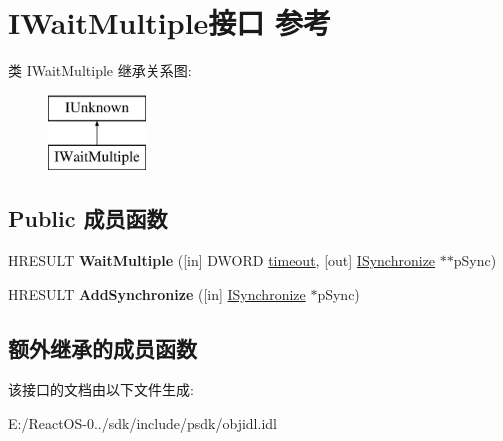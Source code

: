 \hypertarget{interface_i_wait_multiple}{}\section{I\+Wait\+Multiple接口 参考}
\label{interface_i_wait_multiple}
类 I\+Wait\+Multiple 继承关系图\+:\begin{figure}[H]
\begin{center}
\leavevmode
\includegraphics[height=2.000000cm]{interface_i_wait_multiple}
\end{center}
\end{figure}
\subsection*{Public 成员函数}
\begin{DoxyCompactItemize}
\item 
\mbox{\label{interface_i_wait_multiple_a8045e28628891ec72b5b2523a5f3c2fd}} 
H\+R\+E\+S\+U\+LT {\bfseries Wait\+Multiple} (\mbox{[}in\mbox{]} D\+W\+O\+RD \hyperlink{structtimeout}{timeout}, \mbox{[}out\mbox{]} \hyperlink{interface_i_synchronize}{I\+Synchronize} $\ast$$\ast$p\+Sync)
\item 
\mbox{\label{interface_i_wait_multiple_ae3c45377e9264438b9a25df29b2e44e6}} 
H\+R\+E\+S\+U\+LT {\bfseries Add\+Synchronize} (\mbox{[}in\mbox{]} \hyperlink{interface_i_synchronize}{I\+Synchronize} $\ast$p\+Sync)
\end{DoxyCompactItemize}
\subsection*{额外继承的成员函数}


该接口的文档由以下文件生成\+:\begin{DoxyCompactItemize}
\item 
E\+:/\+React\+O\+S-\/0../sdk/include/psdk/objidl.\+idl\end{DoxyCompactItemize}
